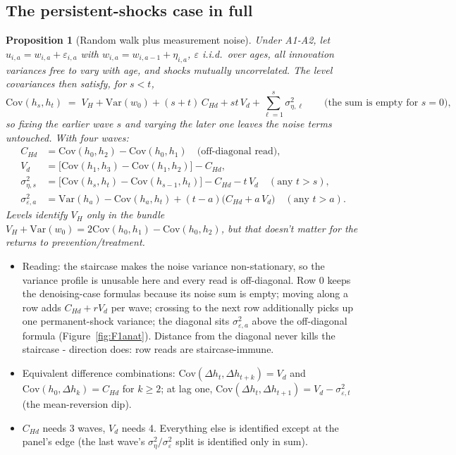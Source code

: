 \documentclass[11pt]{article}
\newtheorem{proposition}{Proposition}
\theoremstyle{remark}
\newcommand{\Var}{\mathrm{Var}}
\newcommand{\Cov}{\mathrm{Cov}}
\begin{document}
\subsection*{The persistent-shocks case in full}

\begin{proposition}[Random walk plus measurement noise]\label{prop:F1}
Under A1-A2, let $u_{i,a}=w_{i,a}+\varepsilon_{i,a}$ with $w_{i,a}=w_{i,a-1}+\eta_{i,a}$, $\varepsilon$ i.i.d.\ over ages, all innovation variances free to vary with age, and shocks mutually uncorrelated.
The level covariances then satisfy, for $s<t$,
\begin{equation}
\Cov(h_s,h_t)\;=\;V_H+\Var(w_0)+(s+t)\,C_{Hd}+st\,V_d+\sum_{\ell=1}^{s}\sigma^2_{\eta,\ell}
\qquad\text{(the sum is empty for $s=0$)},
\end{equation}
so fixing the earlier wave $s$ and varying the later one leaves the noise terms untouched. With four waves:
\begin{align}
C_{Hd} &= \Cov(h_0,h_2)-\Cov(h_0,h_1) \quad\text{(off-diagonal read)},\\
V_d &= \bigl[\Cov(h_1,h_3)-\Cov(h_1,h_2)\bigr]-C_{Hd},\\
\sigma^2_{\eta,s} &= \bigl[\Cov(h_s,h_t)-\Cov(h_{s-1},h_t)\bigr]-C_{Hd}-t\,V_d \quad (\text{any } t>s),\\
\sigma^2_{\varepsilon,a} &= \Var(h_a)-\Cov(h_a,h_t)+(t-a)\bigl(C_{Hd}+a\,V_d\bigr) \quad (\text{any } t>a).
\end{align}
Levels identify $V_H$ only in the bundle $V_H+\Var(w_0)=2\Cov(h_0,h_1)-\Cov(h_0,h_2)$, but that doesn't matter for the returns to prevention/treatment.
\end{proposition}

\begin{itemize}
\item Reading: the staircase makes the noise variance non-stationary, so the variance profile is unusable here and every read is off-diagonal. Row $0$ keeps the denoising-case formulas because its noise sum is empty; moving along a row adds $C_{Hd}+rV_d$ per wave; crossing to the next row additionally picks up one permanent-shock variance; the diagonal sits $\sigma^2_{\varepsilon,a}$ above the off-diagonal formula (Figure~\ref{fig:F1anat}).
Distance from the diagonal never kills the staircase - direction does: row reads are staircase-immune.
\item Equivalent difference combinations: $\Cov(\Delta h_t,\Delta h_{t+k})=V_d$ and $\Cov(h_0,\Delta h_k)=C_{Hd}$ for $k\ge2$; at lag one, $\Cov(\Delta h_t,\Delta h_{t+1})=V_d-\sigma^2_{\varepsilon,t}$ (the mean-reversion dip).
\item $C_{Hd}$ needs 3 waves, $V_d$ needs 4. Everything else is identified except at the panel's edge (the last wave's $\sigma^2_\eta/\sigma^2_\varepsilon$ split is identified only in sum).
\end{itemize}
\end{document}
